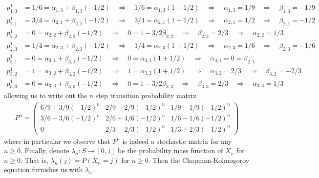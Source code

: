 \documentclass[11pt, letterpaper]{article}
\begin{document}
    \begin{align*}
        p_{1,3}^1&=1/6=\alpha_{1,3}+\beta_{1,3}(-1/2)\quad\Rightarrow\quad 1/6=\alpha_{1,3}(1+1/2)\quad\Rightarrow\quad\alpha_{1,3}=1/9\quad\Rightarrow\quad\beta_{1,3}=-1/9\\
        p_{2,1}^1&=3/4=\alpha_{2,1}+\beta_{2,1}(-1/2)\quad\Rightarrow\quad 3/4=\alpha_{2,1}(1+1/2)\quad\Rightarrow\quad\alpha_{2,1}=1/2\quad\Rightarrow\quad\beta_{2,1}=-1/2\\
        p_{2,2}^1&=0=\alpha_{2,2}+\beta_{2,2}(-1/2)\quad\Rightarrow\quad 0=1-3/2\beta_{2,2}\quad\Rightarrow\quad\beta_{2,2}=2/3\quad\Rightarrow\quad\alpha_{2,2}=1/3\\
        p_{2,3}^1&=1/4=\alpha_{2,3}+\beta_{2,3}(-1/2)\quad\Rightarrow\quad 1/4=\alpha_{2,3}(1+1/2)\quad\Rightarrow\quad\alpha_{2,3}=1/6\quad\Rightarrow\quad\beta_{2,3}=-1/6\\
        p_{3,1}^1&=0=\alpha_{3,1}+\beta_{3,1}(-1/2)\quad\Rightarrow\quad 0=\alpha_{3,1}(1+1/2)\quad\Rightarrow\quad\alpha_{3,1}=0=\beta_{2,1}\\
        p_{3,2}^1&=1=\alpha_{3,2}+\beta_{3,2}(-1/2)\quad\Rightarrow\quad 1=\alpha_{3,2}(1+1/2)\quad\Rightarrow\quad\alpha_{3,2}=2/3\quad\Rightarrow\quad\beta_{3,2}=-2/3\\
        p_{3,3}^1&=0=\alpha_{3,3}+\beta_{3,3}(-1/2)\quad\Rightarrow\quad 0=1-3/2\beta_{3,3}\quad\Rightarrow\quad\beta_{3,3}=2/3\quad\Rightarrow\quad\alpha_{3,3}=1/3
    \end{align*}
    allowing us to write out the $n$ step transition probability matrix
    \begin{align*}
        P^n=\begin{pmatrix}
            6/9+3/9(-1/2)^n & 2/9 -2/9(-1/2)^n & 1/9 - 1/9(-1/2)^n\\
            3/6 - 3/6(-1/2)^n & 2/6+4/6(-1/2)^n & 1/6 - 1/6(-1/2)^n\\
            0 & 2/3 - 2/3(-1/2)^n & 1/3 + 2/3(-1/2)^n
        \end{pmatrix}
    \end{align*}
    where in particular we observe that $P^n$ is indeed a stochastic matrix for any $n\geq 0$. Finally, denote $\lambda_n:S\rightarrow[0,1]$ be the probability mass function of
    $X_n$ for $n\geq 0$. That is, $\lambda_n(j)=P(X_n=j)$ for $n\geq 0$. Then the Chapman-Kolmogorov equation furnishes us with $\lambda_n$.
\end{document}
